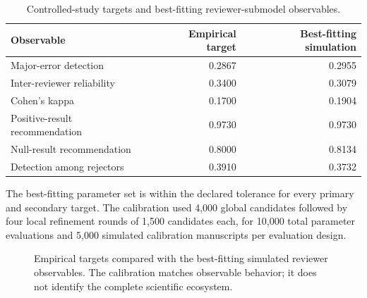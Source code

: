 \begin{table}[ht]
\centering
\caption{Controlled-study targets and best-fitting reviewer-submodel observables.}
\label{tab:empiricalcalibration}
\small
\begin{tabular}{lrr}
\toprule
Observable & Empirical target & Best-fitting simulation\\
\midrule
Major-error detection & 0.2867 & 0.2955\\
Inter-reviewer reliability & 0.3400 & 0.3079\\
Cohen's kappa & 0.1700 & 0.1904\\
Positive-result recommendation & 0.9730 & 0.9730\\
Null-result recommendation & 0.8000 & 0.8134\\
Detection among rejectors & 0.3910 & 0.3732\\
\bottomrule
\end{tabular}
\end{table}

The best-fitting parameter set is within the declared tolerance for every primary and secondary target. The calibration used 4,000 global candidates followed by four local refinement rounds of 1,500 candidates each, for 10,000 total parameter evaluations and 5,000 simulated calibration manuscripts per evaluation design.

\begin{figure}[ht]
\centering
{}
\caption{Empirical targets compared with the best-fitting simulated reviewer observables. The calibration matches observable behavior; it does not identify the complete scientific ecosystem.}
\label{fig:empiricalcalibration}
\end{figure}

